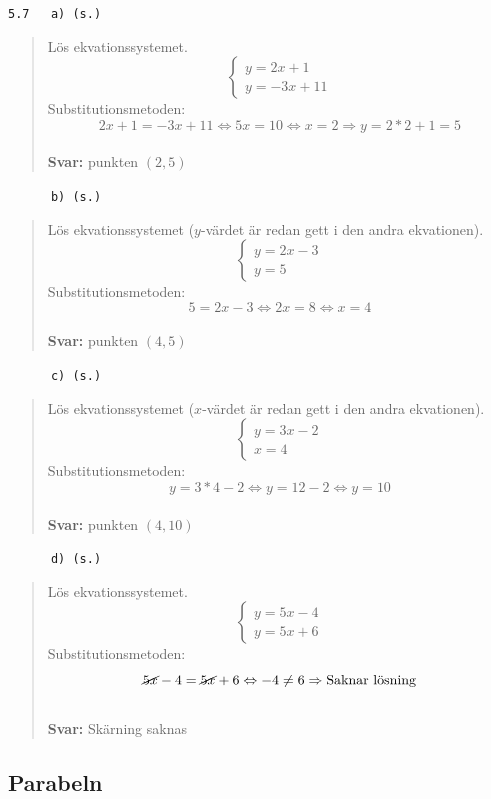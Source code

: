 \documentclass[a4paper]{article}
\newcommand{\tskcol}[1]{\textcolor{tskcol}{#1}}
\begin{document}
	\texttt{\tskcol{5.7~~~a) (s.)}}
	\begin{quotation}
		\noindent
		Lös ekvationssystemet.
		\[\begin{cases} 
		y=2x+1 \\ 
		y=-3x+11
		\end{cases}\]
		Substitutionsmetoden:
		\[2x+1=-3x+11 \Leftrightarrow
		5x=10 \Leftrightarrow
		x=2 \Rightarrow
		y=2*2+1=5\]
		\\
		\textbf{Svar:} punkten $(2,5)$
	\end{quotation}
	
	\texttt{\tskcol{~~~~~~b) (s.)}}
	\begin{quotation}
		\noindent
		Lös ekvationssystemet ($y$-värdet är redan gett i den andra ekvationen).
		\[\begin{cases} 
		y=2x-3 \\ 
		y=5
		\end{cases}\]
		Substitutionsmetoden:
		\[5=2x-3 \Leftrightarrow
		2x=8 \Leftrightarrow
		x=4\]
		\\
		\textbf{Svar:} punkten $(4,5)$
	\end{quotation}
	
	\pagebreak
	\texttt{\tskcol{~~~~~~c) (s.)}}
	\begin{quotation}
		\noindent
		Lös ekvationssystemet ($x$-värdet är redan gett i den andra ekvationen).
		\[\begin{cases} 
		y=3x-2 \\ 
		x=4
		\end{cases}\]
		Substitutionsmetoden:
		\[y=3*4-2 \Leftrightarrow
		y=12-2 \Leftrightarrow
		y=10\]
		\\
		\textbf{Svar:} punkten $(4,10)$
	\end{quotation}
	
	\texttt{\tskcol{~~~~~~d) (s.)}}
	\begin{quotation}
		\noindent
		Lös ekvationssystemet.
		\[\begin{cases} 
		y=5x-4 \\ 
		y=5x+6
		\end{cases}\]
		Substitutionsmetoden:
		\[\cancel{5x}-4=\cancel{5x}+6 \Leftrightarrow
		-4 \neq 6 \Rightarrow \text{Saknar lösning}\]
		\\
		\textbf{Svar:} Skärning saknas
	\end{quotation}
	
	\subsection*{Parabeln}
	
\end{document}
